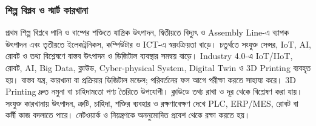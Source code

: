 \subsubsection{শিল্প বিপ্লব ও স্মার্ট কারখানা}
প্রথম শিল্প বিপ্লবে পানি ও বাষ্পের শক্তিতে যান্ত্রিক উৎপাদন, দ্বিতীয়তে বিদ্যুৎ ও Assembly Line-এ ব্যাপক উৎপাদন এবং তৃতীয়তে ইলেকট্রনিকস, কম্পিউটার ও ICT-এ স্বয়ংক্রিয়তা বাড়ে। চতুর্থতে সংযুক্ত সেন্সর, IoT, AI, রোবট ও তথ্য বিশ্লেষণে বাস্তব উৎপাদন ও ডিজিটাল ব্যবস্থার সমন্বয় বাড়ে।
Industry 4.0-এ IoT/IIoT, রোবট, AI, Big Data, ক্লাউড, Cyber-physical System, Digital Twin ও 3D Printing ব্যবহৃত হয়।  বাস্তব যন্ত্র, কারখানা বা প্রক্রিয়ার ডিজিটাল মডেল; পরিবর্তনের ফল আগে পরীক্ষা করতে সাহায্য করে। 3D Printing দ্রুত নমুনা বা চাহিদামতো পণ্য তৈরিতে উপযোগী। ক্লাউডে তথ্য রাখা ও দূর থেকে বিশ্লেষণ করা যায়। সংযুক্ত কারখানায় উৎপাদন, ত্রুটি, চাহিদা, শক্তির ব্যবহার ও রক্ষণাবেক্ষণ দেখে PLC, ERP/MES, রোবট বা কর্মী কাজ বদলাতে পারে। নেটওয়ার্ক ও নিয়ন্ত্রণকে অননুমোদিত প্রবেশ থেকে রক্ষা করতে হয়।
